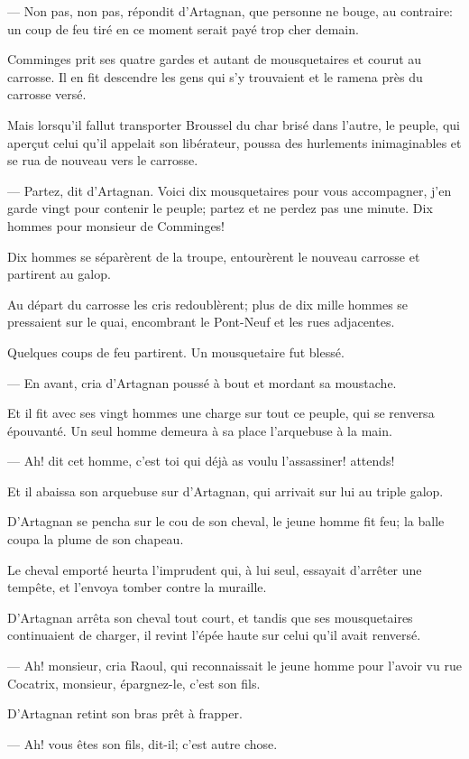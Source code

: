 — Non pas, non pas, répondit d'Artagnan, que personne ne bouge, au contraire: un coup de feu tiré en ce moment serait payé trop cher demain.

Comminges prit ses quatre gardes et autant de mousquetaires et courut au carrosse. Il en fit descendre les gens qui s'y trouvaient et le ramena près du carrosse versé.

Mais lorsqu'il fallut transporter Broussel du char brisé dans l'autre, le peuple, qui aperçut celui qu'il appelait son libérateur, poussa des hurlements inimaginables et se rua de nouveau vers le carrosse.

— Partez, dit d'Artagnan. Voici dix mousquetaires pour vous accompagner, j'en garde vingt pour contenir le peuple; partez et ne perdez pas une minute. Dix hommes pour monsieur de Comminges!

Dix hommes se séparèrent de la troupe, entourèrent le nouveau carrosse et partirent au galop.

Au départ du carrosse les cris redoublèrent; plus de dix mille hommes se pressaient sur le quai, encombrant le Pont-Neuf et les rues adjacentes.

Quelques coups de feu partirent. Un mousquetaire fut blessé.

— En avant, cria d'Artagnan poussé à bout et mordant sa moustache.

Et il fit avec ses vingt hommes une charge sur tout ce peuple, qui se renversa épouvanté. Un seul homme demeura à sa place l'arquebuse à la main.

— Ah! dit cet homme, c'est toi qui déjà as voulu l'assassiner! attends!

Et il abaissa son arquebuse sur d'Artagnan, qui arrivait sur lui au triple galop.

D'Artagnan se pencha sur le cou de son cheval, le jeune homme fit feu; la balle coupa la plume de son chapeau.

Le cheval emporté heurta l'imprudent qui, à lui seul, essayait d'arrêter une tempête, et l'envoya tomber contre la muraille.

D'Artagnan arrêta son cheval tout court, et tandis que ses mousquetaires continuaient de charger, il revint l'épée haute sur celui qu'il avait renversé.

— Ah! monsieur, cria Raoul, qui reconnaissait le jeune homme pour l'avoir vu rue Cocatrix, monsieur, épargnez-le, c'est son fils.

D'Artagnan retint son bras prêt à frapper.

— Ah! vous êtes son fils, dit-il; c'est autre chose.

